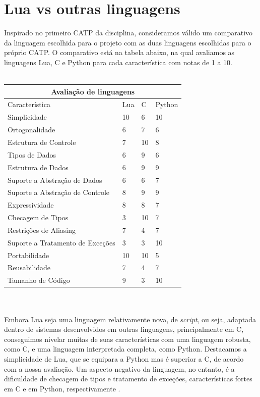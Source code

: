 \documentclass[rel_mlp]{iiufrgs}
\begin{document}
\chapter{Lua vs outras linguagens}

Inspirado no primeiro CATP da disciplina, consideramos válido um comparativo da linguagem escolhida para o projeto com as duas linguagens escolhidas para o próprio CATP. O comparativo está na tabela abaixo, na qual avaliamos as linguagens Lua, C e Python para cada característica com notas de 1 a 10.
\\ \\

\begin{tabular}{ |p{6cm}||p{1.5cm}|p{1.5cm}|p{1.5cm}|  }
 \hline
 \multicolumn{4}{|c|}{Avaliação de linguagens} \\
 \hline
 Característica					& Lua 	&	C	&Python\\
 \hline
 Simplicidade   				& 10    &	6	&   10\\
 Ortogonalidade					& 6	 	& 	7  	&	6\\
 Estrutura de Controle 			& 7 	& 10	&  8\\
 Tipos de Dados    				& 6 	& 	9	&  6\\
 Estrutura de Dados				& 6  	&   9	&  9\\
 Suporte a Abstração de Dados	& 6  	&   6   &	7\\
 Suporte a Abstração de Controle& 8  	&   9	&   9\\
 Expressividade					& 8  	&   8	&   7\\
 Checagem de Tipos				& 3  	&  10 	&   7\\
 Restrições de Aliasing			& 7  	&  4	&  7\\
 Suporte a Tratamento de Exceções& 3  &  3		&  10\\
 Portabilidade					& 10  	& 10	& 5\\
 Reusabilidade					& 7  	& 4		& 7\\
 Tamanho de Código				& 9  	& 3		& 10\\
 \hline
\end{tabular}
\\ \\



Embora Lua seja uma linguagem relativamente nova, de \textit{script}, ou seja, adaptada dentro de sistemas desenvolvidos em outras linguagens, principalmente em C, conseguimos nivelar muitas de suas características com uma linguagem robusta, como C, e uma linguagem interpretada completa, como Python. Destacamos a simplicidade de Lua, que se equipara a Python mas é superior a C, de acordo com a nossa avaliação. Um aspecto negativo da linguagem, no entanto, é a dificuldade de checagem de tipos e tratamento de exceções, características fortes em C e em Python, respectivamente \cite{DocLua}.
\end{document}
